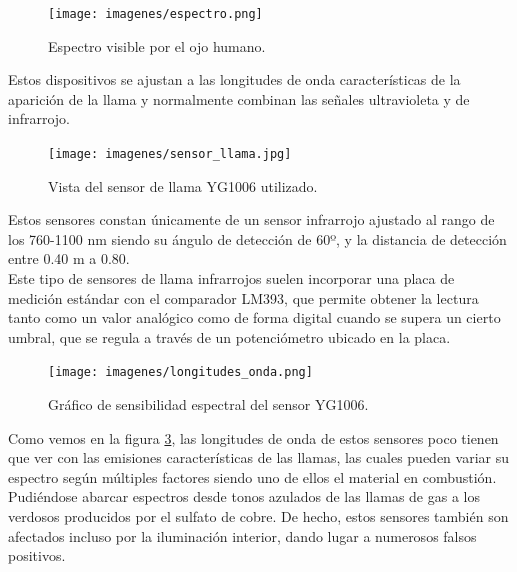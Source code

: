 \begin{figure}[H]
  \begin{center}
    \texttt{[image: imagenes/espectro.png]}
  \end{center}
  \caption{Espectro visible por el ojo humano.}
  \label{fig:}
\end{figure}

Estos dispositivos se ajustan a las longitudes de onda características de la aparición de la llama y normalmente combinan las señales ultravioleta y de infrarrojo.\\
 
 \begin{figure}[H]
  \begin{center}
    \texttt{[image: imagenes/sensor\_llama.jpg]}
  \end{center}
  \caption{Vista del sensor de llama YG1006 utilizado.}
  \label{figura:sensor_mq_2_potenciometro}
\end{figure}

Estos sensores constan únicamente de un sensor infrarrojo ajustado al rango de los 760-1100 nm siendo su ángulo de detección de 60º, y la distancia de detección entre 0.40 m a 0.80.\\

Este tipo de sensores de llama infrarrojos suelen incorporar una placa de medición estándar con el comparador LM393, que permite obtener la lectura tanto como un valor analógico
como de forma digital cuando se supera un cierto umbral, que se regula a través de un potenciómetro ubicado en la placa.\\

 \begin{figure}[H]
  \begin{center}
    \texttt{[image: imagenes/longitudes\_onda.png]}
  \end{center}
  \caption{Gráfico de sensibilidad espectral del sensor YG1006.}
  \label{figura:longitudes_onda}
\end{figure}

Como vemos en la figura \ref{figura:longitudes_onda}, las longitudes de onda de estos sensores poco tienen que ver con las emisiones características de las llamas, las cuales
pueden variar su espectro según múltiples factores siendo uno de ellos el material en combustión. Pudiéndose abarcar espectros desde tonos azulados de las llamas de gas a los
verdosos producidos por el sulfato de cobre. De hecho, estos sensores también son afectados incluso por la iluminación interior, dando lugar a numerosos falsos positivos.\\

